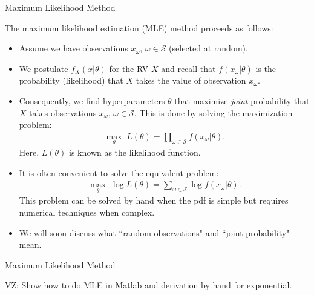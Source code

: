 \documentclass[9pt]{beamer}
\begin{document}
%
\begin{frame}{Maximum Likelihood Method}

The maximum likelihood estimation (MLE) method proceeds as follows:

\begin{itemize}
\item Assume we have observations $x_\omega,\, \omega \in \mathcal{S}$ (selected at random).
\item We postulate $f_X(x|\theta)$ for the RV $X$ and recall that $f(x_\omega|\theta)$ is the probability (likelihood) that $X$ takes the value of observation $x_\omega$.  

\item Consequently, we find hyperparameters $\theta$ that maximize {\em joint} probability that $X$ takes observations $x_\omega,\,\omega \in \mathcal{S}$. This is done by solving the maximization problem:
\begin{align*}
\max_\theta\; L(\theta)=\prod_{\omega \in \mathcal{S}}f(x_\omega|\theta).
\end{align*}
Here, $L(\theta)$ is known as the likelihood function. 

\item It is often convenient to solve the equivalent problem:
\begin{align*}
\max_\theta\; \log L(\theta)=\sum_{\omega \in \mathcal{S}}\log f(x_\omega|\theta).
\end{align*}
This problem can be solved by hand when the pdf is simple but requires numerical techniques when complex. 
\item We will soon discuss what ``random observations" and ``joint probability" mean. 
\end{itemize}

\end{frame}


%
\begin{frame}{Maximum Likelihood Method}

\begin{block}{}
{\color{red} VZ: Show how to do MLE in Matlab and derivation by hand for exponential.}
\end{block}

\end{frame}
\end{document}
